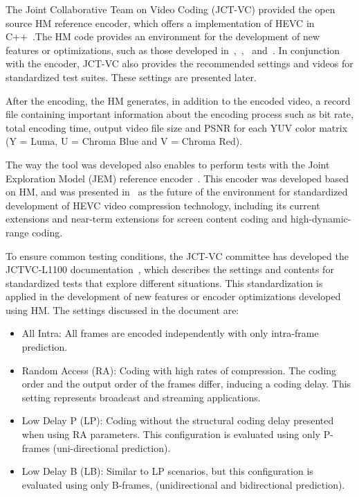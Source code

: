 \documentclass[journal]{IEEEtran}
\begin{document}
The Joint Collaborative Team on Video Coding (JCT-VC) provided the open source HM reference encoder, which offers a implementation of HEVC in C++~\cite{Bossen:15}.The HM code provides an environment for the development of new features or optimizations, such as those developed in~\cite{oliveira:16},~\cite{Yoon:13},~\cite{Correa:12} and~\cite{Weerakkody:14}. In conjunction with the encoder, JCT-VC also provides the recommended settings and videos for standardized test suites. These settings are presented later.

After the encoding, the HM generates, in addition to the encoded video, a record file containing important information about the encoding process such as bit rate, total encoding time, output video file size and PSNR for each YUV color matrix (Y = Luma, U = Chroma Blue and V = Chroma Red).


The way the tool was developed also enables to perform tests with the Joint Exploration Model (JEM) reference encoder~\cite{Bossen:17}. This encoder was developed based on HM, and was presented in~\cite{JVET:2015} as the future of the environment for standardized development of HEVC video compression technology, including its current extensions and near-term extensions for screen content coding and high-dynamic-range coding.



To ensure common testing conditions, the JCT-VC committee has developed the JCTVC-L1100 documentation~\cite{Bossen:13}, which describes the settings and contents for standardized tests that explore different situations. This standardization is applied in the development of new features or encoder optimizations developed using HM. The settings discussed in the document are:

\begin{itemize}

  \item All Intra: All frames are encoded independently with only intra-frame prediction.
  \item Random Access (RA): Coding with high rates of compression. The coding order and the output order of the frames differ, inducing a coding delay. This setting represents broadcast and streaming applications.
  \item Low Delay P (LP): Coding without the structural coding delay presented when using RA parameters. This configuration is evaluated using only P-frames (uni-directional prediction).
  \item Low Delay B (LB): Similar to LP scenarios, but this configuration is evaluated using only B-frames, (unidirectional and bidirectional prediction).

\end{itemize}
\end{document}
